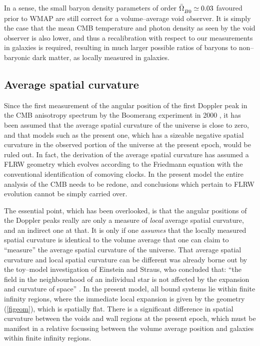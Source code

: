 \documentclass[12pt]{article}
\begin{document}
In a sense, the small baryon density parameters of order $\bOmBn\simeq0.03$
favoured prior to WMAP are still correct for a volume--average
void observer. It is simply the case that the mean CMB temperature and
photon density as seen by the void observer is also lower, and thus a
recalibration with respect to our measurements in galaxies is required,
resulting in much larger possible ratios of baryons to non--baryonic dark
matter, as locally measured in galaxies.

\subsection{Average spatial curvature\label{curve}}

Since the first measurement of the angular position of the first Doppler
peak in the CMB anisotropy spectrum by the Boomerang experiment in 2000
\cite{boom}, it has been assumed that the average spatial curvature of the
universe is close to zero, and that models such as the present one, which has
a sizeable negative spatial curvature in the observed portion of the universe
at the present epoch, would be ruled out. In fact, the derivation of the
average spatial curvature has assumed a FLRW geometry which evolves
according to the Friedmann equation with the conventional identification
of comoving clocks. In the present model the entire
analysis of the CMB needs to be redone, and conclusions which pertain to
FLRW evolution cannot be simply carried over.

The essential point, which has been overlooked, is that the angular positions
of the Doppler peaks really are only a measure of {\em local}
average spatial curvature, and an indirect one at that. It is only if
one {\em assumes} that the locally measured spatial curvature is identical to
the volume average that one can claim to ``measure'' the average spatial
curvature of the universe. That average spatial curvature and local
spatial curvature can be different was already borne out by the
toy--model investigation of Einstein and Straus, who concluded
that: ``the field in the neighbourhood of an individual star
is not affected by the expansion and curvature of space'' \cite{gruyere}.
In the present model, all bound systems lie
within finite infinity regions, where the immediate local expansion is
given by the geometry (\ref{figeom}), which is spatially flat. There is
a significant difference in spatial curvature between the voids and
wall regions at the present epoch, which must be manifest in a relative
focussing between the volume average position and galaxies within finite
infinity regions.
\end{document}

